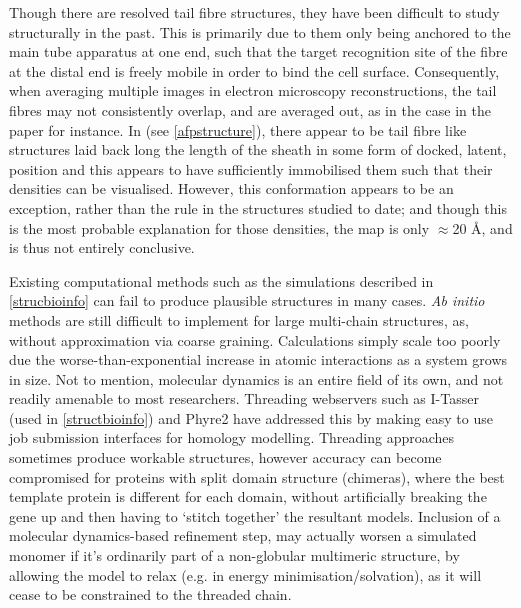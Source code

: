 Though there are resolved tail fibre structures, they have been difficult to study structurally in the past. This is primarily due to them only being anchored to the main tube apparatus at one end, such that the target recognition site of the fibre at the distal end is freely mobile in order to bind the cell surface. Consequently, when averaging multiple images in electron microscopy reconstructions, the tail fibres may not consistently overlap, and are averaged out, as in the case in the \citep{Ge2015a} paper for instance. In \cite{Heymann2013} (see \vref{afpstructure}), there appear to be tail fibre like structures laid back long the length of the sheath in some form of docked, latent, position and this appears to have sufficiently immobilised them such that their densities can be visualised. However, this conformation appears to be an exception, rather than the rule in the structures studied to date; and though this is the most probable explanation for those densities, the map is only $\approx$20 \AA, and is thus not entirely conclusive.

Existing computational methods such as the simulations described in \vref{strucbioinfo} can fail to produce plausible structures in many cases. \emph{Ab initio} methods are still difficult to implement for large multi-chain structures, as, without approximation via coarse graining. Calculations simply scale too poorly due the worse-than-exponential increase in atomic interactions as a system grows in size. Not to mention, molecular dynamics is an entire field of its own, and not readily amenable to most researchers. Threading webservers such as I-Tasser \citep{Yang2014, Zhang2008, Roy2010} (used in \vref{structbioinfo}) and Phyre2 \citep{Kelly2015} have addressed this by making easy to use job submission interfaces for homology modelling. Threading approaches sometimes produce workable structures, however accuracy can become compromised for proteins with split domain structure (chimeras), where the best template protein is different for each domain, without artificially breaking the gene up and then having to `stitch together' the resultant models. Inclusion of a molecular dynamics-based refinement step, may actually worsen a simulated monomer if it's ordinarily part of a non-globular multimeric structure, by allowing the model to relax (e.g. in energy minimisation/solvation), as it will cease to be constrained to the threaded chain.

